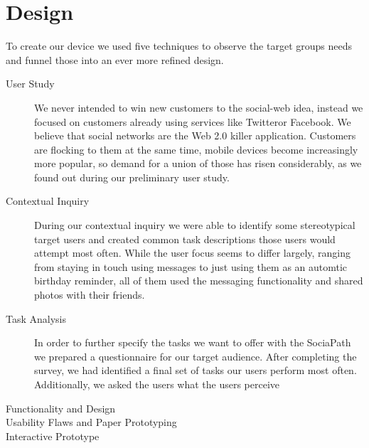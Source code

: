 %
%
%
\section{Design}
%
To create our device we used five techniques 
to observe the target groups needs and funnel those 
into an ever more refined design. 
\begin{description}
  \item[User Study] We never intended to win new customers to 
    the social-web idea, instead we focused on customers already 
    using services like Twitter\trademark or Facebook\registered. 
    We believe that social networks are the Web 2.0 killer application. 
    Customers are flocking to them at the same time, mobile devices
    become increasingly more popular, so demand for a union of 
    those has risen considerably, as we found out during our preliminary 
    user study.
  \item[Contextual Inquiry]
    During our contextual inquiry we were able to identify some stereotypical 
    target users and created common task descriptions those users would 
    attempt most often. While the user focus seems to differ largely, ranging 
    from staying in touch using messages to just using them as an automtic 
    birthday reminder, all of them used the messaging functionality and 
    shared photos with their friends. 
  \item[Task Analysis]
    In order to further specify the tasks we want to offer with the SociaPath
    we prepared a questionnaire for our target audience. After completing the 
    survey, we had identified a final set of tasks our users perform most often. 
    Additionally, we asked the users what the users perceive
  \item[Functionality and Design]
  \item[Usability Flaws and Paper Prototyping]
  \item[Interactive Prototype]
\end{description}
